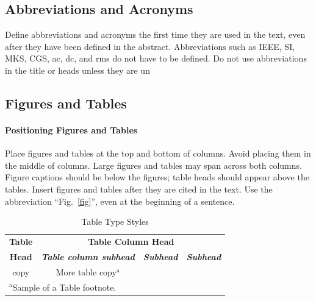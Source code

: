 \documentclass[conference]{IEEEtran}
\begin{document}
\subsection{Abbreviations and Acronyms}\label{AA}
Define abbreviations and acronyms the first time they are used in the text, 
even after they have been defined in the abstract. Abbreviations such as 
IEEE, SI, MKS, CGS, ac, dc, and rms do not have to be defined. Do not use 
abbreviations in the title or heads unless they are un

\subsection{Figures and Tables}\label{FAT}
\paragraph{Positioning Figures and Tables} Place figures and tables at the top and 
bottom of columns. Avoid placing them in the middle of columns. Large 
figures and tables may span across both columns. Figure captions should be 
below the figures; table heads should appear above the tables. Insert 
figures and tables after they are cited in the text. Use the abbreviation 
``Fig.~\ref{fig}'', even at the beginning of a sentence.

\begin{table}[htbp]
\caption{Table Type Styles}
\begin{center}
\begin{tabular}{|c|c|c|c|}
\hline
\textbf{Table}&\multicolumn{3}{|c|}{\textbf{Table Column Head}} \\
\cline{2-4} 
\textbf{Head} & \textbf{\textit{Table column subhead}}& \textbf{\textit{Subhead}}& \textbf{\textit{Subhead}} \\
\hline
copy& More table copy$^{\mathrm{a}}$& &  \\
\hline
\multicolumn{4}{l}{$^{\mathrm{a}}$Sample of a Table footnote.}
\end{tabular}
\label{tab1}
\end{center}
\end{table}
\end{document}
